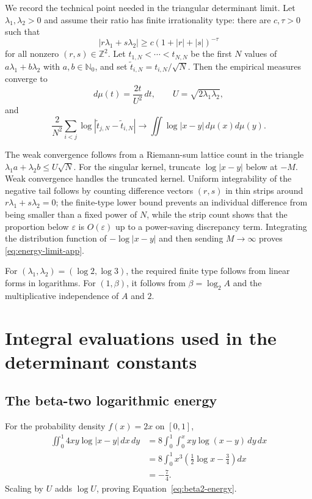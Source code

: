 \documentclass[11pt,oneside]{article}
\theoremstyle{definition}
\theoremstyle{remark}
\newcommand{\Nzero}{\mathbb N_0}
\newcommand{\Z}{\mathbb Z}
\begin{document}
We record the technical point needed in the triangular determinant limit.  Let
$\lambda_1,\lambda_2>0$ and assume their ratio has finite irrationality type:
there are $c,\tau>0$ such that
\[
 |r\lambda_1+s\lambda_2|\ge c(1+|r|+|s|)^{-\tau}
\]
for all nonzero $(r,s)\in\Z^2$.  Let $t_{1,N}<\cdots<t_{N,N}$ be the first $N$
values of $a\lambda_1+b\lambda_2$ with $a,b\in\Nzero$, and set
$\widetilde t_{i,N}=t_{i,N}/\sqrt N$.  Then the empirical measures converge to
\[
 d\mu(t)=\frac{2t}{U^2}\,dt,\qquad U=\sqrt{2\lambda_1\lambda_2},
\]
and
\begin{equation}\label{eq:energy-limit-app}
 \frac{2}{N^2}\sum_{i<j}\log|\widetilde t_{j,N}-\widetilde t_{i,N}|
 \longrightarrow\iint\log|x-y|\,d\mu(x)d\mu(y).
\end{equation}

The weak convergence follows from a Riemann-sum lattice count in the triangle
$\lambda_1a+\lambda_2b\le U\sqrt N$.  For the singular kernel, truncate
$\log|x-y|$ below at $-M$.  Weak convergence handles the truncated kernel.
Uniform integrability of the negative tail follows by counting difference
vectors $(r,s)$ in thin strips around
$r\lambda_1+s\lambda_2=0$; the finite-type lower bound prevents an individual
difference from being smaller than a fixed power of $N$, while the strip count
shows that the proportion below $\varepsilon$ is $O(\varepsilon)$ up to a
power-saving discrepancy term.  Integrating the distribution function of
$-\log|x-y|$ and then sending $M\to\infty$ proves
\eqref{eq:energy-limit-app}.

For $(\lambda_1,\lambda_2)=(\log2,\log3)$, the required finite type follows from
linear forms in logarithms.  For $(1,\beta)$, it follows from
$\beta=\log_2 A$ and the multiplicative independence of $A$ and $2$.

\section{Integral evaluations used in the determinant constants}

\subsection{The beta-two logarithmic energy}

For the probability density $f(x)=2x$ on $[0,1]$,
\begin{align*}
 \iint_0^1 4xy\log|x-y|\,dx\,dy
 &=8\int_0^1\int_0^xxy\log(x-y)\,dy\,dx\\
 &=8\int_0^1x^3\left(\frac12\log x-\frac34\right)dx\\
 &=-\frac74.
\end{align*}
Scaling by $U$ adds $\log U$, proving
Equation~\eqref{eq:beta2-energy}.
\end{document}
